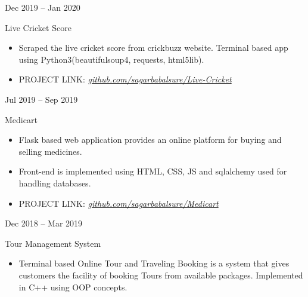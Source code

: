 \documentclass[a4paper,10pt]{article}
\newlength{\cvcolumngapwidth}
\newlength{\cvleftcolumnwidth}
\newlength{\cvrightcolumnwidth}
\newcommand{\cvtitlestyle}[1]{{\large\cvtitlefont\textcolor{cvtitlecolor}{#1}}}
\newcommand{\cvdurationstyle}[1]{{\small\cvdurationfont\textcolor{cvdurationcolor}{#1}}}
\newlength{\cvafteritemskipamount}
\newlength{\cvaftertitleskipamount}
\newlength{\cvparskip}
\newcommand{\cvitem}[2]{
    \begin{minipage}[t]{\cvleftcolumnwidth}
        \raggedleft #1
    \end{minipage}%
    \hspace{\cvcolumngapwidth}%
    \begin{minipage}[t]{\cvrightcolumnwidth}
        \setlength{\parskip}{\cvparskip} #2
    \end{minipage}

    \vspace{\cvafteritemskipamount}
}
\newcommand{\cvtitle}[1]{
    \cvtitlestyle{#1}

    \vspace{\cvaftertitleskipamount}
    \vspace{-\cvparskip}
}
\begin{document}



\cvitem{
    \cvdurationstyle{Dec 2019 -- Jan 2020}
}{
    \cvtitle{Live Cricket Score}


    \begin{itemize}[leftmargin=*]
         \item Scraped the live cricket score from crickbuzz website. Terminal based app using Python3(beautifulsoup4, requests, html5lib).
         \item PROJECT LINK: \textit{\href{https://github.com/sagarbabalsure/Live-Cricket}{github.com/sagarbabalsure/Live-Cricket}}
    \end{itemize}
}

\cvitem{
    \cvdurationstyle{Jul 2019 -- Sep 2019}
}{
    \cvtitle{Medicart}


    \begin{itemize}[leftmargin=*]
         \item Flask based web application provides an online platform for buying and selling medicines.
        \item Front-end is implemented using HTML, CSS, JS and sqlalchemy used for handling databases.
         \item PROJECT LINK: \textit{\href{https://github.com/sagarbabalsure/Medicart}{github.com/sagarbabalsure/Medicart}}
    \end{itemize}
}

\cvitem{
    \cvdurationstyle{Dec 2018 -- Mar 2019}
}{
    \cvtitle{Tour Management System}


    \begin{itemize}[leftmargin=*]
         \item Terminal based Online Tour and Traveling Booking is a system that gives customers the facility of booking Tours from available packages. Implemented in C++ using OOP concepts. 
    \end{itemize}
}
\end{document}

